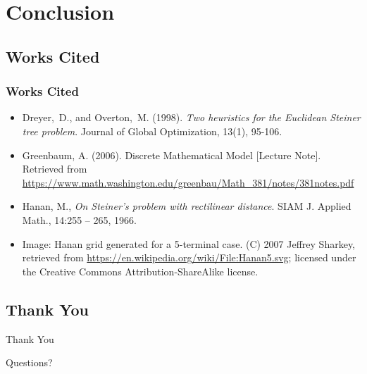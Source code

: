 \documentclass{beamer}
\begin{document}
\section{Conclusion}

\subsection{Works Cited}
\begin{frame}
\frametitle{Works Cited}
\begin{itemize}
\item {
Dreyer, D., and Overton, M. (1998). \textit{Two heuristics for the Euclidean Steiner tree problem}. Journal of Global Optimization, 13(1), 
95-106.}

\item {
Greenbaum, A. (2006). Discrete Mathematical Model [Lecture Note]. Retrieved from \url{https://www.math.washington.edu/greenbau/Math_381/notes/381notes.pdf}
}

\item {
Hanan, M., \textit{On Steiner's problem with rectilinear distance}. SIAM J. Applied Math., 14:255 -- 265, 1966.
}

\item {
Image: Hanan grid generated for a 5-terminal case. (C) 2007 Jeffrey Sharkey, retrieved from
\url{https://en.wikipedia.org/wiki/File:Hanan5.svg}; licensed under the Creative Commons Attribution-ShareAlike license.
}

\end{itemize}
\end{frame}

\subsection{Thank You}
\begin{frame}
\Huge{\centerline{Thank You}}
\hfill\newline
\centerline{Questions?}
\end{frame}
\end{document}
